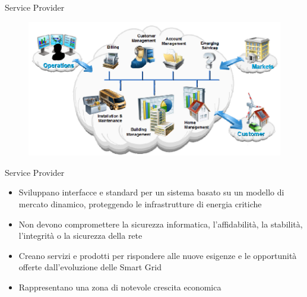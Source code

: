 


\begin{frame}[fragile]{Service Provider}
	\begin{figure}[h] 
		\includegraphics[scale=0.45]{imgs/ser.png}
	\end{figure}
\end{frame}

\begin{frame}[fragile]{Service Provider}
	\begin{itemize}[<+- | alert@+>]
		\item Sviluppano interfacce e standard per un sistema basato su un modello di mercato dinamico, proteggendo le infrastrutture di energia critiche   
		\item Non devono compromettere la sicurezza informatica, l'affidabilità, la stabilità, l'integrità o la sicurezza della rete %
		\item Creano servizi e prodotti per rispondere alle nuove esigenze e le opportunità offerte dall'evoluzione delle Smart Grid 
		\item Rappresentano una zona di notevole crescita economica
	\end{itemize}
\end{frame}



